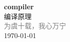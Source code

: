 \vspace*{\fill}
\begin{center}
    \textcolor{brown!50}{\Huge\textbf{compiler}} \\[1em]
    \textcolor{brown!60!white}{\Large 编译原理} \\[2em]
    \textcolor{gray}{\large 为虞十载，我心万宁} \\[1em]
    \today
\end{center}
\vspace*{\fill}
\clearpage


\clearpage

\clearpage

\clearpage


